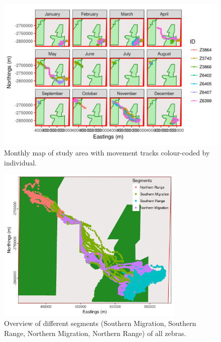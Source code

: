 \documentclass[12pt,a4paper, twoside, english]{article}
\begin{document}


\begin{figure}[H]
  \centering
  \includegraphics[width=\textwidth]{figures/Zebra_Month_BWA.png}
  \caption[Monthly zebra locations, Ngamiland]{Monthly map of study area with movement tracks colour-coded by individual.}
  \label{fig:zebra_month_bwa}
\end{figure}

\begin{figure}[H]
  \centering
  \includegraphics[width=0.8\textwidth]{figures/Zebra_Migration_BWA_Overview.png}
  \caption[Segmentation of zebra movements Ngamiland]{Overview of different segments (Southern Migration, Southern Range, Northern Migration, Northern Range) of all zebras.}
  \label{fig:segment_bwa_overview}
\end{figure}
\end{document}
